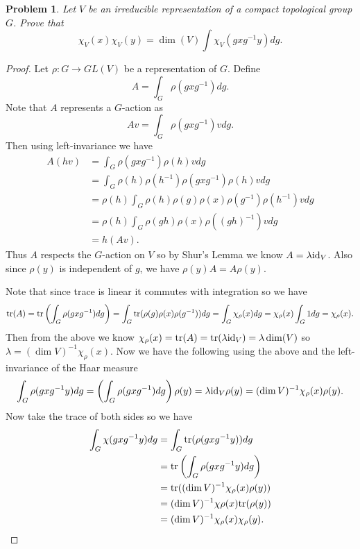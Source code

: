 \documentclass{article}
\newcommand{\tr}{\textup{tr}}
\newtheorem{problem}{Problem}
\begin{document}
\begin{problem}
Let $V$ be an irreducible representation of a compact topological group $G$. Prove that
\[
\chi_V(x) \chi_V(y) = \dim(V) \int \chi_V(gxg^{-1}y) dg.
\]
\end{problem}
\begin{proof}
Let $\rho : G \to GL(V)$ be a representation of $G$. Define
\[
A = \int_G \rho(gxg^{-1}) dg.
\]
Note that $A$ represents a $G$-action as
\[
Av = \int_G \rho(gxg^{-1})v dg.
\]
Then using left-invariance we have
\begin{align*}
A(hv)
&= \int_G \rho(gxg^{-1})\rho(h)vdg\\
&= \int_G \rho(h)\rho(h^{-1}) \rho(gxg^{-1}) \rho(h) v dg\\
&= \rho(h) \int_G \rho(h) \rho(g) \rho(x) \rho(g^{-1}) \rho(h^{-1}) v dg\\
&= \rho(h) \int_G \rho(gh) \rho(x) \rho((gh)^{-1}) v dg\\
&= h(Av).
\end{align*}
Thus $A$ respects the $G$-action on $V$ so by Shur's Lemma we know $A = \lambda \textup{id}_V$. Also since $\rho(y)$ is independent of $g$, we have $\rho(y)A = A \rho(y)$.

Note that since trace is linear it commutes with integration so we have
\[
\tr(A) = \tr \left ( \int_G \rho(gxg^{-1}) dg \right ) = \int_G \tr(\rho(g)\rho(x)\rho(g^{-1})) dg = \int_G \chi_{\rho}(x) dg = \chi_{\rho}(x) \int_G 1 dg = \chi_{\rho}(x).
\]
Then from the above we know $\chi_{\rho}(x) = \tr(A) = \tr(\lambda \textup{id}_V) = \lambda \dim(V)$ so $\lambda = (\dim V)^{-1} \chi_{\rho}(x)$. Now we have the following using the above and the left-invariance of the Haar measure
\[
\int_G \rho(gxg^{-1}y) dg = \left ( \int_G \rho(gxg^{-1}) dg \right ) \rho(y) = \lambda \textup{id}_V \rho(y) = (\dim V)^{-1} \chi_{\rho}(x) \rho(y).
\]
Now take the trace of both sides so we have
\begin{align*}
\int_G \chi(gxg^{-1}y) dg
&= \int_G \tr(\rho(gxg^{-1}y)) dg\\
&= \tr \left ( \int_G \rho(gxg^{-1}y) dg \right )\\
&= \tr((\dim V)^{-1} \chi_{\rho}(x) \rho(y))\\
&= (\dim V)^{-1} \chi{\rho}(x) \tr(\rho(y))\\
&= (\dim V)^{-1} \chi_{\rho}(x) \chi_{\rho}(y).
\end{align*}
\end{proof}
\end{document}
